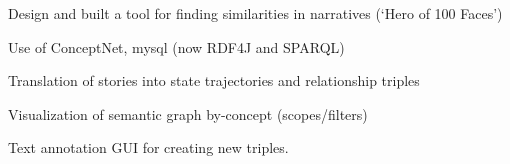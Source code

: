 \documentclass[letterpaper]{deedy-resume} %
\begin{document}
\begin{minipage}[t]{0.66\textwidth}
\vspace{\topsep} %
Design and built a tool for finding similarities in narratives (‘Hero of 100 Faces’)
\begin{tightitemize}
\item Use of ConceptNet, mysql (now RDF4J and SPARQL)
\item Translation of stories into state trajectories and relationship triples
\item Visualization of semantic graph by-concept (scopes/filters)
\item Text annotation GUI for creating new triples.
\end{tightitemize}

\sectionspace %




\end{minipage} %


\newpage %


\end{document}
